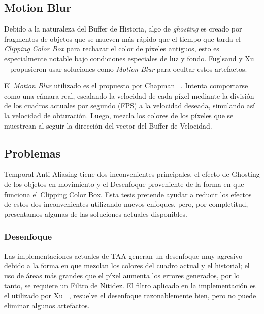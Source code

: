 \documentclass[pregrado]{tesis-usb} %
\begin{document}
\subsection{Motion Blur}
Debido a la naturaleza del Buffer de Historia, algo de \textit{ghosting} es creado por fragmentos de objetos que se mueven más rápido que el tiempo que tarda el \textit{Clipping Color Box} para rechazar el color de píxeles antiguos, esto es especialmente notable bajo condiciones especiales de luz y fondo. Fuglsand y Xu ~\cite{Fuglsand2016, XU2016} propusieron usar soluciones como \textit{Motion Blur} para ocultar estos artefactos.

El \textit{Motion Blur} utilizado es el propuesto por Chapman ~\cite{Chapman2012}. Intenta comportarse como una cámara real, escalando la velocidad de cada píxel mediante la división de los cuadros actuales por segundo (FPS) a la velocidad deseada, simulando así la velocidad de obturación. Luego, mezcla los colores de los píxeles que se muestrean al seguir la dirección del vector del Buffer de Velocidad.


\subsection{Problemas}
Temporal Anti-Aliasing tiene dos inconvenientes principales, el efecto de Ghosting de los objetos en movimiento y el Desenfoque proveniente de la forma en que funciona el Clipping Color Box. Esta tesis pretende ayudar a reducir los efectos de estos dos inconvenientes utilizando nuevos enfoques, pero, por completitud, presentamos algunas de las soluciones actuales disponibles.

\subsubsection{Desenfoque} 
Las implementaciones actuales de TAA generan un desenfoque muy agresivo debido a la forma en que mezclan los colores del cuadro actual y el historial; el uso de áreas más grandes que el píxel aumenta los errores generados, por lo tanto, se requiere un Filtro de Nitidez. El filtro aplicado en la implementación es el utilizado por Xu ~\cite{XU2016}, resuelve el desenfoque razonablemente bien, pero no puede eliminar algunos artefactos. 
\end{document}
